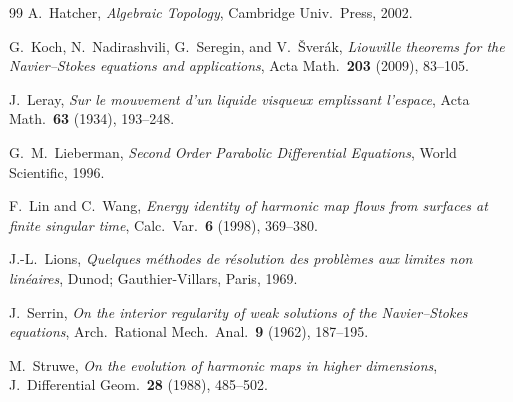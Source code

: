 \documentclass[12pt, reqno]{amsart}
\theoremstyle{definition}
\theoremstyle{remark}
\numberwithin{equation}{section}
\begin{document}
\begin{thebibliography}{99}
A.~Hatcher, \emph{Algebraic Topology}, Cambridge Univ.\ Press, 2002.

G.~Koch, N.~Nadirashvili, G.~Seregin, and V.~\v{S}ver\'ak,
\emph{Liouville theorems for the Navier--Stokes equations and
applications},
Acta Math.\ \textbf{203} (2009), 83--105.

J.~Leray, \emph{Sur le mouvement d'un liquide visqueux emplissant
l'espace}, Acta Math.\ \textbf{63} (1934), 193--248.

G.~M.~Lieberman, \emph{Second Order Parabolic Differential Equations},
World Scientific, 1996.

F.~Lin and C.~Wang,
\emph{Energy identity of harmonic map flows from surfaces at finite
singular time},
Calc.\ Var.\ \textbf{6} (1998), 369--380.

J.-L.~Lions,
\emph{Quelques m\'ethodes de r\'esolution des probl\`emes aux limites
non lin\'eaires},
Dunod; Gauthier-Villars, Paris, 1969.

J.~Serrin,
\emph{On the interior regularity of weak solutions of the Navier--Stokes
equations},
Arch.\ Rational Mech.\ Anal.\ \textbf{9} (1962), 187--195.

M.~Struwe,
\emph{On the evolution of harmonic maps in higher dimensions},
J.\ Differential Geom.\ \textbf{28} (1988), 485--502.

\end{thebibliography}
\end{document}
